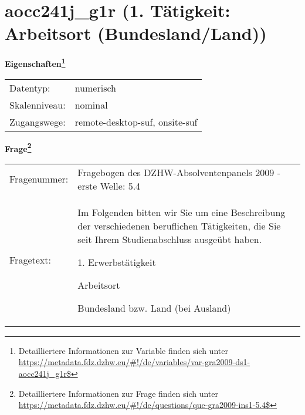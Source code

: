 
    \setcounter{footnote}{0}

    \vspace*{-1.8cm}
	\section{aocc241j\_g1r (1. Tätigkeit: Arbeitsort (Bundesland/Land))}
	\label{section:aocc241j_g1r}



    \vspace*{0.5cm}
    \noindent\textbf{Eigenschaften\footnote{Detailliertere Informationen zur Variable finden sich unter
		\url{https://metadata.fdz.dzhw.eu/\#!/de/variables/var-gra2009-ds1-aocc241j_g1r$}}}\\
	\begin{tabularx}{\hsize}{@{}lX}
	Datentyp: & numerisch \\
	Skalenniveau: & nominal \\
	Zugangswege: &
	  remote-desktop-suf, 
	  onsite-suf
 \\
    \end{tabularx}



				\vspace*{0.5cm}
                \noindent\textbf{Frage\footnote{Detailliertere Informationen zur Frage finden sich unter
		              \url{https://metadata.fdz.dzhw.eu/\#!/de/questions/que-gra2009-ins1-5.4$}}}\\
				\begin{tabularx}{\hsize}{@{}lX}
					Fragenummer: &
					  Fragebogen des DZHW-Absolventenpanels 2009 - erste Welle:
					  5.4
 \\
					Fragetext: & Im Folgenden bitten wir Sie um eine Beschreibung der verschiedenen beruflichen Tätigkeiten, die Sie seit Ihrem Studienabschluss ausgeübt haben.\par  1. Erwerbstätigkeit\par  Arbeitsort\par  Bundesland bzw. Land (bei Ausland) \\
				\end{tabularx}





